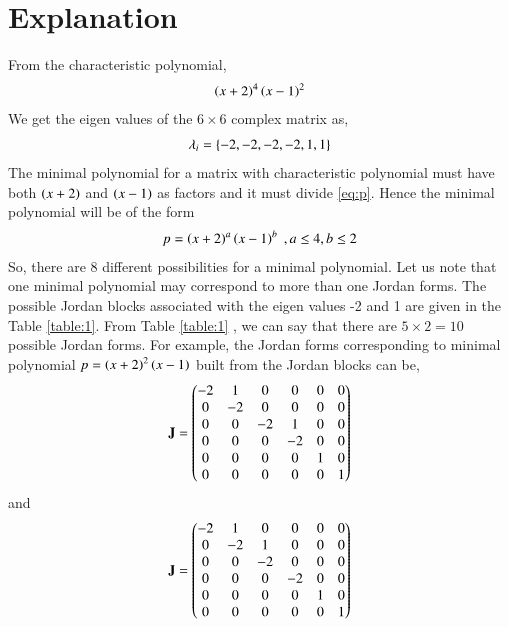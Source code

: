 \documentclass[journal,12pt,twocolumn]{IEEEtran}
\numberwithin{table}{section}
\begin{document}
\section{Explanation}
From the characteristic polynomial,
\begin{align}
\left(x+2\right)^4\left(x-1\right)^2\label{eq:p}
\end{align}
We get the eigen values of the $6\times6$ complex matrix as,
\begin{align}
\lambda_i=\left\{-2,-2,-2,-2,1,1\right\}\label{eq:eig}
\end{align}
The minimal polynomial for a matrix with characteristic polynomial must have both $\left(x+2\right)$ and $\left(x-1\right)$ as factors and it must divide \eqref{eq:p}. Hence the minimal polynomial will be of the form 
\begin{align}
p=\left(x+2\right)^a\left(x-1\right)^b \; ,a\le 4,b\le2
\end{align}
So, there are 8 different possibilities for a minimal polynomial. Let us note that one minimal polynomial may correspond to more than one Jordan forms. The possible Jordan blocks associated with the eigen values -2 and 1 are given in the Table \ref{table:1}. From Table \ref{table:1} , we can say that there are $5\times2=10$ possible Jordan forms.
For example, the Jordan forms corresponding to minimal polynomial $p=\left(x+2\right)^2\left(x-1\right)$ built from the Jordan blocks can be,
\begin{align}
\mathbf{J}=\begin{pmatrix}-2&1&0&0&0&0\\0&-2&0&0&0&0\\0&0&-2&1&0&0\\0&0&0&-2&0&0\\0&0&0&0&1&0\\0&0&0&0&0&1\end{pmatrix}
\end{align}
and
\begin{align}
\mathbf{J}=\begin{pmatrix}-2&1&0&0&0&0\\0&-2&1&0&0&0\\0&0&-2&0&0&0\\0&0&0&-2&0&0\\0&0&0&0&1&0\\0&0&0&0&0&1\end{pmatrix}
\end{align}
\renewcommand{\thetable}{1}
\end{document}
